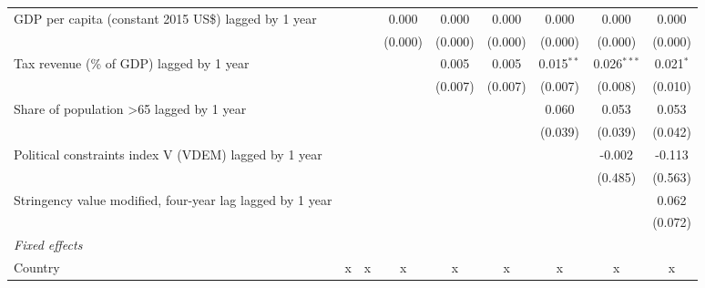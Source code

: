 \begin{tabular}{lcccccccc}
   GDP per capita (constant 2015 US\$) lagged by 1 year      &                &                & 0.000          & 0.000          & 0.000          & 0.000          & 0.000          & 0.000\\   
                                                             &                &                & (0.000)        & (0.000)        & (0.000)        & (0.000)        & (0.000)        & (0.000)\\   
   Tax revenue (\% of GDP) lagged by 1 year                  &                &                &                & 0.005          & 0.005          & 0.015$^{**}$   & 0.026$^{***}$  & 0.021$^{*}$\\   
                                                             &                &                &                & (0.007)        & (0.007)        & (0.007)        & (0.008)        & (0.010)\\   
   Share of population >65 lagged by 1 year                  &                &                &                &                &                & 0.060          & 0.053          & 0.053\\   
                                                             &                &                &                &                &                & (0.039)        & (0.039)        & (0.042)\\   
   Political constraints index V (VDEM) lagged by 1 year     &                &                &                &                &                &                & -0.002         & -0.113\\   
                                                             &                &                &                &                &                &                & (0.485)        & (0.563)\\   
   Stringency value modified, four-year lag lagged by 1 year &                &                &                &                &                &                &                & 0.062\\   
                                                             &                &                &                &                &                &                &                & (0.072)\\   
   \emph{Fixed effects}\\
   Country                                                   & x              & x              & x              & x              & x              & x              & x              & x\\  

\end{tabular}
